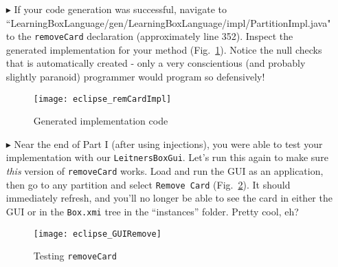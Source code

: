 \begin{itemize}

\item[$\blacktriangleright$] If your code generation was successful, navigate to
``Learning\-Box\-Language/\-gen/\-Learning\-Box\-Language/\-impl/\-Partition\-Impl.java" to the \texttt{\-remove\-Card} declaration (approximately line 352).
Inspect the generated implementation for your method (Fig.~\ref{fig:remCardImpl}). Notice the null checks that is automatically created - only a very
conscientious (and probably slightly paranoid) programmer would program so defensively!

\vspace{0.5cm}

\begin{figure}[htp]
\begin{center}
  \texttt{[image: eclipse\_remCardImpl]}
  \caption{Generated implementation code}
  \label{fig:remCardImpl}
\end{center}
\end{figure}

\newpage

\item[$\blacktriangleright$] Near the end of Part I (after using injections), you were able to test your implementation with our \texttt{LeitnersBoxGui}. Let's
run this again to make sure \emph{this} version of \texttt{removeCard} works. Load and run the GUI as an application, then go to any partition and select
\texttt{Remove Card} (Fig.~\ref{fig:GUIRemCard}). It should immediately refresh, and you'll no longer be able to see the card in either the GUI or in the
\texttt{Box.xmi} tree in the ``instances'' folder. Pretty cool, eh?

\vspace{1cm}

\begin{figure}[htp]
\begin{center}
  \texttt{[image: eclipse\_GUIRemove]}
  \caption{Testing \texttt{removeCard}}
  \label{fig:GUIRemCard}
\end{center}
\end{figure}

\end{itemize}
